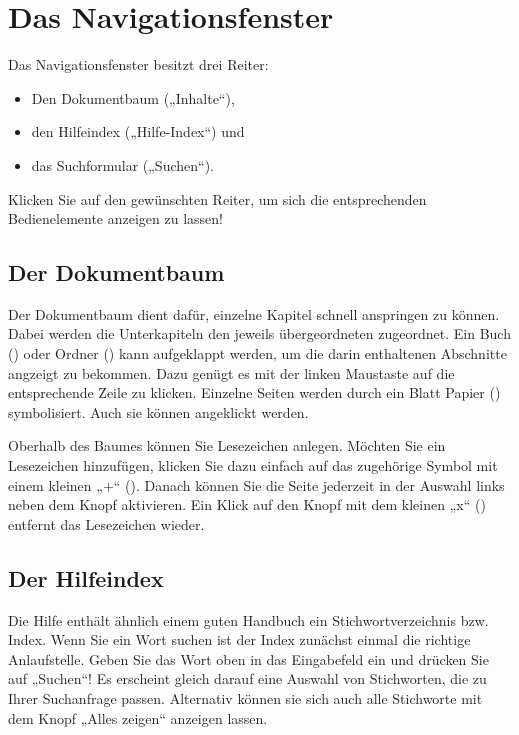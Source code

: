 \section{Das Navigationsfenster}
\label{sec:der-suchbaum}


Das Navigationsfenster besitzt drei Reiter:
\begin{itemize}
\item Den Dokumentbaum („Inhalte“),
\item den Hilfeindex („Hilfe-Index“) und
\item das Suchformular („Suchen“).
\end{itemize}

Klicken Sie auf den gewünschten Reiter, um sich die entsprechenden
Bedienelemente anzeigen zu lassen!

\subsection{Der Dokumentbaum}

Der Dokumentbaum dient dafür, einzelne Kapitel schnell anspringen zu
können. Dabei werden die Unterkapiteln den jeweils übergeordneten
zugeordnet. Ein Buch () oder Ordner
() kann aufgeklappt werden, um die darin
enthaltenen Abschnitte angzeigt zu bekommen. Dazu genügt es mit der
linken Maustaste auf die entsprechende Zeile zu klicken. Einzelne
Seiten werden durch ein Blatt Papier
() symbolisiert. Auch sie können
angeklickt werden.

Oberhalb des Baumes können Sie Lesezeichen anlegen. Möchten Sie ein
Lesezeichen hinzufügen, klicken Sie dazu einfach auf das zugehörige
Symbol mit einem kleinen „+“
(). Danach können Sie die Seite
jederzeit in der Auswahl links neben dem Knopf aktivieren. Ein Klick
auf den Knopf mit dem kleinen „x“ ()
entfernt das Lesezeichen wieder.

\subsection{Der Hilfeindex}

Die Hilfe enthält ähnlich einem guten Handbuch ein
Stichwortverzeichnis bzw. Index. Wenn Sie ein Wort suchen ist der Index zunächst einmal die richtige Anlaufstelle. Geben Sie das Wort oben in das Eingabefeld ein und drücken Sie auf „Suchen“! Es erscheint gleich darauf eine Auswahl von Stichworten, die zu Ihrer Suchanfrage passen. Alternativ können sie sich auch alle Stichworte mit dem Knopf „Alles zeigen“ anzeigen lassen.

